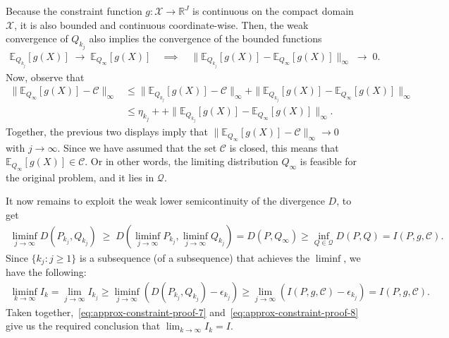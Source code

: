 \documentclass{article}
\theoremstyle{plain}
\theoremstyle{definition}
\newcommand{\lrp}[1]{\left( #1 \right)}
\newcommand{\R}{\mathbb{R}}
\newcommand{\calC}{\mathcal C}
\newcommand{\calQ}{\mathcal Q}
\newcommand{\calX}{\mathcal X}
\begin{document}
Because the constraint function $g:\calX \to\R^J$ is continuous on the compact domain $\calX$, it is also bounded and continuous coordinate-wise. Then, the weak convergence of $Q_{k_j}$ also implies the convergence of the bounded functions 
\begin{align}
    \mathbb{E}_{Q_{k_j}}[g(X)] \; \longrightarrow \; \mathbb{E}_{Q_\infty}[g(X)] \quad \implies \quad \|\mathbb{E}_{Q_{k_j}}[g(X)] - \mathbb{E}_{Q_{\infty}}[g(X)] \|_\infty  \; \longrightarrow \; 0. 
\end{align}
Now, observe that 
\begin{align}
    \|\mathbb{E}_{Q_{\infty}}[g(X)] - \calC \|_\infty  &\leq \|\mathbb{E}_{Q_{k_j}}[g(X)] - \calC \|_\infty  + \|\mathbb{E}_{Q_{k_j}}[g(X)] - \mathbb{E}_{Q_{\infty}}[g(X)] \|_\infty \\
    & \leq \eta_{k_j} + + \|\mathbb{E}_{Q_{k_j}}[g(X)] - \mathbb{E}_{Q_{\infty}}[g(X)] \|_\infty.  
\end{align}
Together, the previous two displays imply that $\|\mathbb{E}_{Q_{\infty}}[g(X)] - \calC \|_\infty \to 0$ with $j \to \infty$. Since we have assumed that the set $\calC$ is closed, this means that $\mathbb{E}_{Q_{\infty}}[g(X)] \in \calC$. Or in other words, the limiting distribution $Q_\infty$ is feasible for the original problem, and it lies in $\calQ$. 

It now remains to exploit the weak lower semicontinuity of the divergence $D$, to get 
\begin{align}
    \liminf_{j \to \infty} D(P_{k_j}, Q_{k_j}) \; \geq \; D\lrp{ \liminf_{j \to \infty} P_{k_j}, \liminf_{j \to \infty} Q_{k_j} } = D(P, Q_\infty) \geq \inf_{Q \in \calQ} D(P, Q) = I(P, g, \calC). 
\end{align}
Since $\{k_j: j \geq 1\}$ is a subsequence (of a subsequence) that achieves the $\liminf$, we have the following: 
\begin{align}
    \liminf_{k \to \infty} I_k = \lim_{j \to \infty} I_{k_j} \geq \liminf_{j \to \infty} \lrp{D(P_{k_j}, Q_{k_j}) - \epsilon_{k_j}} \geq \lim_{j \to \infty} \lrp{I(P, g, \calC) - \epsilon_{k_j}} = I(P, g, \calC). \label{eq:approx-constraint-proof-8}
\end{align}
Taken together,~\eqref{eq:approx-constraint-proof-7} and~\eqref{eq:approx-constraint-proof-8} give us the required conclusion that $\lim_{k \to \infty} I_k = I$. 
\end{document}

